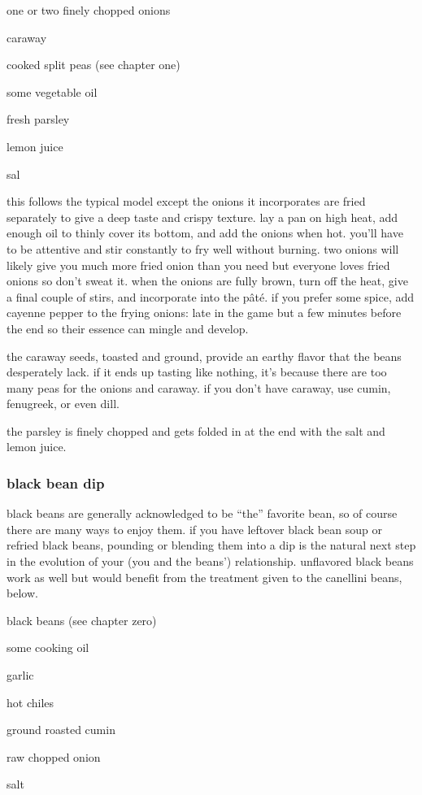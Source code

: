 \begin{ingredients}
  \item one or two finely chopped onions
  \item caraway
  \item cooked split peas (see chapter one)
  \item some vegetable oil
  \item fresh parsley
  \item lemon juice
  \item sal
\end{ingredients}

this follows the typical model except the onions it incorporates are
fried separately to give a deep taste and crispy texture. lay a pan on
high heat, add enough oil to thinly cover its bottom, and add the
onions when hot. you'll have to be attentive and stir constantly to
fry well without burning. two onions will likely give you much more
fried onion than you need but everyone loves fried onions so don't
sweat it. when the onions are fully brown, turn off the heat, give a
final couple of stirs, and incorporate into the p\^{a}t\'{e}. if you
prefer some spice, add cayenne pepper to the frying onions: late in
the game but a few minutes before the end so their essence can mingle
and develop.

the caraway seeds, toasted and ground, provide an earthy flavor that
the beans desperately lack. if it ends up tasting like nothing,
it's because there are too many peas for the onions and caraway. if
you don't have caraway, use cumin, fenugreek, or even dill.

the parsley is finely chopped and gets folded in at the end with the
salt and lemon juice.

\subsubsection{black bean dip}

black beans are generally acknowledged to be ``the'' favorite
bean, so of course there are many ways to enjoy them. if you have
leftover black bean soup or refried black beans, pounding or blending
them into a dip is the natural next step in the evolution of your (you
and the beans') relationship. unflavored black beans work as well
but would benefit from the treatment given to the canellini beans,
below.

\begin{ingredients}
  \item black beans (see chapter zero)
  \item some cooking oil
  \item garlic
  \item hot chiles
  \item ground roasted cumin
  \item raw chopped onion
  \item salt
\end{ingredients}

